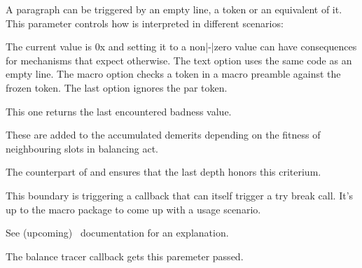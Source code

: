 \startnewprimitive[title={\prm {autoparagraphmode}}]

A paragraph can be triggered by an empty line, a \type {\par} token or an
equivalent of it. This parameter controls how \type {\par} is interpreted in
different scenarios:


The current value is {\tttf 0x\tohexadecimal\autoparagraphmode} and setting it to
a non|-|zero value can have consequences for mechanisms that expect otherwise.
The text option uses the same code as an empty line. The macro option checks a
token in a macro preamble against the frozen  token. The last option
ignores the par token.

\stopnewprimitive

\startoldprimitive[title={\prm {badness}}]

This one returns the last encountered badness value.

\stopoldprimitive

\startnewprimitive[title={\prm {balanceadjdemerits}}]

These are added to the accumulated demerits depending on the fitness of
neighbouring slots in balancing act.

\stopnewprimitive

\startnewprimitive[title={\prm {balancebottomskip}}]

The counterpart of  and ensures that the last depth honors
this criterium.

\stopnewprimitive

\startnewprimitive[title={\prm {balanceboundary}}]

This boundary is triggering a callback that can itself trigger a try break call. It's up to
the macro package to come up with a usage scenario.

\stopnewprimitive

\startnewprimitive[title={\prm {balancebreakpasses}}]

See (upcoming) \CONTEXT\ documentation for an explanation.

\stopnewprimitive

\startnewprimitive[title={\prm {balancechecks}}]

The balance tracer callback gets this paremeter passed.

\stopnewprimitive

\startnewprimitive[title={\prm {balanceemergencyshrink}}]

